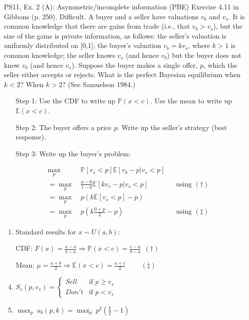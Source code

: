 \begin{frame}{PS11, Ex. 2 (A): Asymmetric/incomplete information (PBE)}
    Exercise 4.11 in Gibbons (p. 250). Difficult. A buyer and a seller have valuations $v_b$ and $v_s$. It is common knowledge that there are gains from trade (i.e., that $v_b > v_s$), but the size of the gains is private information, as follows: the seller’s valuation is uniformly distributed on [0,1]; the buyer’s valuation $v_b = kv_s$, where $k > 1$ is common knowledge; the seller knows $v_s$ (and hence $v_b$) but the buyer does not know $v_b$ (and hence $v_s$). Suppose the buyer makes a single offer, $p$, which the seller either accepts or rejects. What is the perfect Bayesian equilibrium when $k < 2$? When $k > 2$? (See Samuelson 1984.) \vspace{-8pt}
    \begin{multicols}{2}
      \begin{itemize}
        \item[Step 1:] Use the CDF to write up $\mathbb{P}(x<c)$. Use the mean to write up $\mathbb{E}(x<c)$.
        \item[Step 2:] The buyer offers a price \textit{p}. Write up the seller's strategy (best response).
        \item[Step 3:] Write up the buyer's problem:
      \end{itemize} \vspace{-8pt}
      \begin{align*}
        \displaystyle{\max_p}&\ \mathbb{P}[v_s<p]\mathbb{E}[v_b-p|v_s<p]\\
       =\displaystyle{\max_p}&\ \frac{p-0}{1-0}\mathbb{E}[kv_s-p|v_s<p]&&\text{using }(\dagger)\\
       =\displaystyle{\max_p}&\ p\left(k\mathbb{E}[v_s<p]-p\right)\\
       =\displaystyle{\max_p}&\ p\left(k\frac{0+p}{2}-p\right)&&\text{using }(\ddagger)
      \end{align*}
      \vfill\null\columnbreak
      \begin{enumerate}
        \item Standard results for $x\sim U(a, b):$
        \item[CDF:] $F(x)=\frac{x-a}{b-a}\Rightarrow\mathbb{P}(x<c)=\frac{c-a}{b-a}\ \ (\dagger)$
        \item[Mean:] $\mu=\frac{a+b}{2}\Rightarrow\mathbb{E}(x<c)=\frac{a+c}{2}\quad\quad\ (\ddagger)$
        \item $S_s(p,v_s)=\left\{\begin{array}{ll}
          Sell  & \text{if }p\geq v_s \\
          Don't & \text{if }p < v_s
        \end{array}\right.$
        \item $\displaystyle{\max_p}\ u_b(p,k)=\displaystyle{\max_p}\ p^2\left(\frac{k}{2}-1\right)$
      \end{enumerate}
      \vfill\null
    \end{multicols}
\end{frame}
